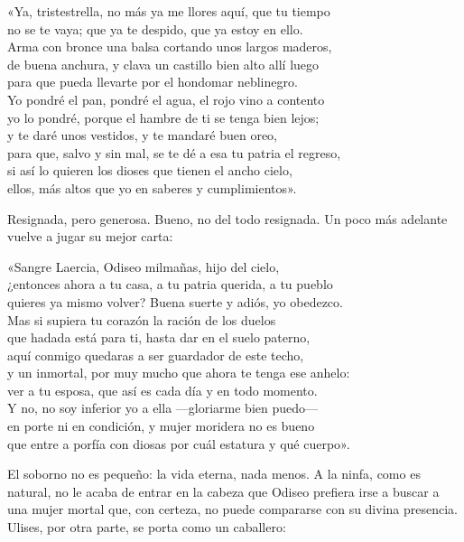 \begin{versocita}
«Ya, tristestrella, no más ya me llores aquí, que tu tiempo\\
no se te vaya; que ya te despido, que ya estoy en ello.\\
Arma con bronce una balsa cortando unos largos maderos,\\
de buena anchura, y clava un castillo bien alto allí luego\\
para que pueda llevarte por el hondomar neblinegro.\\
Yo pondré el pan, pondré el agua, el rojo vino a contento\\
yo lo pondré, porque el hambre de ti se tenga bien lejos;\\
y te daré unos vestidos, y te mandaré buen oreo,\\
para que, salvo y sin mal, se te dé a esa tu patria el regreso,\\
si así lo quieren los dioses que tienen el ancho cielo,\\
ellos, más altos que yo en saberes y cumplimientos».
\end{versocita}

Resignada, pero generosa. Bueno, no del todo resignada. Un poco más adelante vuelve a jugar su mejor carta:

\begin{versocita}
«Sangre Laercia, Odiseo milmañas, hijo del cielo,\\
¿entonces ahora a tu casa, a tu patria querida, a tu pueblo\\
quieres ya mismo volver? Buena suerte y adiós, yo obedezco.\\
Mas si supiera tu corazón la ración de los duelos\\
que hadada está para ti, hasta dar en el suelo paterno,\\
aquí conmigo quedaras a ser guardador de este techo,\\
y un inmortal, por muy mucho que ahora te tenga ese anhelo:\\
ver a tu esposa, que así es cada día y en todo momento.\\
Y no, no soy inferior yo a ella ---gloriarme bien puedo---\\
en porte ni en condición, y mujer moridera no es bueno\\
que entre a porfía con diosas por cuál estatura y qué cuerpo».
\end{versocita}

El soborno no es pequeño: la vida eterna, nada menos. A la ninfa, como es natural, no le acaba de entrar en la cabeza que Odiseo prefiera irse a buscar a una mujer mortal que, con certeza, no puede compararse con su divina presencia. Ulises, por otra parte, se porta como un caballero:

